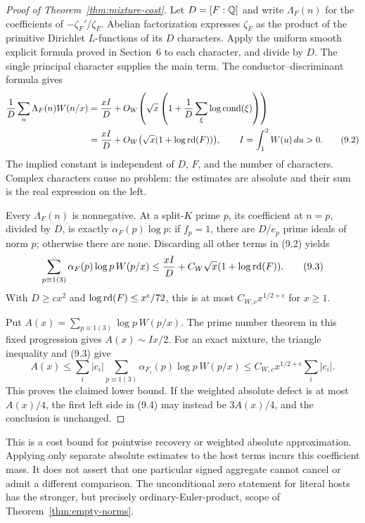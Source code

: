 \begin{proof}[Proof of Theorem~\ref{thm:mixture-cost}]
Let $D=[F:\mathbb Q]$ and write $\Lambda_F(n)$ for the coefficients of
$-\zeta_F'/\zeta_F$. Abelian factorization expresses $\zeta_F$
as the product of the primitive Dirichlet $L$-functions of its
$D$ characters. Apply the uniform smooth explicit formula proved
in Section~6 to each character, and divide by $D$. The single
principal character supplies the main term. The
conductor--discriminant formula gives
\begin{align}
 \frac1D\sum_n\Lambda_F(n)W(n/x)
 &=\frac{xI}{D}
       +O_W\!\left(\sqrt{x}\left(1+
                    \frac1D\sum_\xi\log\operatorname{cond}(\xi)\right)\right)\notag\\
 &=\frac{xI}{D}+O_W\bigl(\sqrt{x}(1+\log\operatorname{rd}(F))\bigr),
 \qquad I=\int_1^2W(u)\,du>0.
                                                        \tag{9.2}
\end{align}
The implied constant is independent of $D$, $F$, and the number
of characters. Complex characters cause no problem: the estimates
are absolute and their sum is the real expression on the left.

Every $\Lambda_F(n)$ is nonnegative. At a split-$K$ prime $p$,
its coefficient at $n=p$, divided by $D$, is exactly
$\alpha_F(p)\log p$: if $f_p=1$, there are $D/e_p$ prime ideals
of norm $p$; otherwise there are none. Discarding all other
terms in (9.2) yields
\[
 \sum_{p\equiv1(3)}\alpha_F(p)\log p\,W(p/x)
 \le\frac{xI}{D}+C_W\sqrt{x}(1+\log\operatorname{rd}(F)).
                                                        \tag{9.3}
\]
With $D\ge c x^2$ and $\log\operatorname{rd}(F)\le x^\epsilon/72$, this is
at most $C_{W,c}x^{1/2+\epsilon}$ for $x\ge1$.

Put $A(x)=\sum_{p\equiv1(3)}\log p\,W(p/x)$.
The prime number theorem in this fixed progression gives
$A(x)\sim Ix/2$. For an exact mixture, the triangle inequality
and (9.3) give
\[
 A(x)\le\sum_i|c_i|
       \sum_{p\equiv1(3)}\alpha_{F_i}(p)\log p\,W(p/x)
       \le C_{W,c}x^{1/2+\epsilon}\sum_i|c_i|.
                                                        \tag{9.4}
\]
This proves the claimed lower bound. If the weighted absolute
defect is at most $A(x)/4$, the first left side in (9.4) may
instead be $3A(x)/4$, and the conclusion is unchanged.
\end{proof}

This is a cost bound for pointwise recovery or weighted absolute
approximation. Applying only separate absolute estimates to the
host terms incurs this coefficient mass. It does not assert that
one particular signed aggregate cannot cancel or admit a different
comparison. The unconditional zero statement for literal hosts
has the stronger, but precisely ordinary-Euler-product, scope of
Theorem~\ref{thm:empty-norms}.

